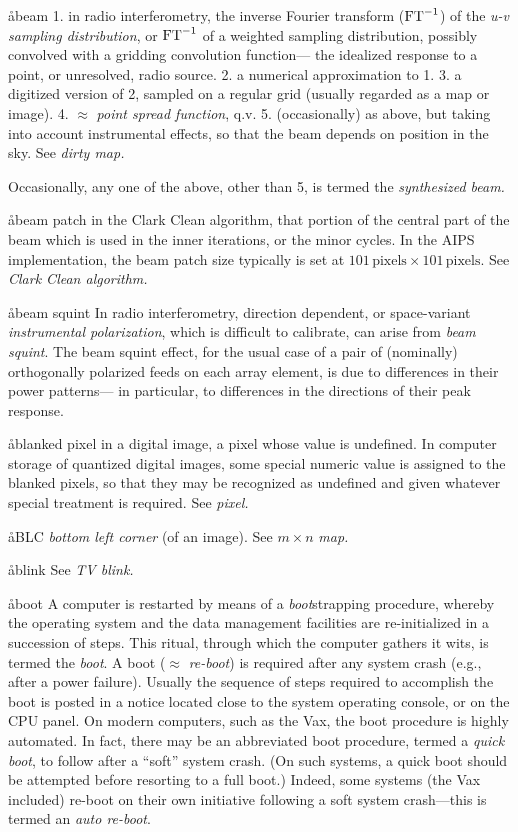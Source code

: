 \aa{beam}
1. in radio interferometry,
the inverse Fourier transform ($\hbox{\rm FT}^{-1}$) of the {\it u-v sampling distribution},
or $\hbox{\rm FT}^{-1}$ of a weighted \uv sampling distribution,
possibly convolved with a gridding convolution function---%
the idealized response to a point, or unresolved, radio
source.
\xspace2. a numerical approximation to 1.
\xspace3. a digitized version of 2, sampled on a
regular grid (usually regarded as a map or image).
\xspace 4. $\approx$  {\it point spread function}, q.v.
\xspace 5. (occasionally) as above, but taking into account
instrumental effects, so that the beam depends on position
in the sky.
See {\it dirty map.}
\par
Occasionally, any one of the above, other than 5, is termed the
{\it synthesized beam.}

\aa{beam patch}
in the Clark Clean algorithm, that portion of the central part
of the beam which is used in the inner iterations, or the minor cycles.
In the AIPS implementation, the beam patch size typically
is set at $101\,\text{pixels}\times101\,\text{pixels}$.
See {\it Clark Clean algorithm.}

\aa{beam squint}
In radio interferometry, direction dependent, or space-variant
{\it instrumental polarization}, which is difficult to calibrate,
can arise from {\it beam squint}.
The beam squint effect, for the usual case of a pair of (nominally)
orthogonally polarized feeds on each array element,
is due to differences in their power patterns---%
in particular, to differences in the directions of their peak response.

\aa{blanked pixel}
in a digital image, a pixel whose value is undefined.
In computer storage of quantized digital images, some
special numeric value is assigned to the blanked pixels,
so that they may be recognized as undefined and given whatever special
treatment is required.
See {\it pixel.}

\aa{BLC} {\it bottom left corner} (of an image).
See $m\times n$ {\it map.}

\aa{blink} See {\it TV blink.}

\aa{boot}
A computer is restarted by means of a
{\it boot}\/strapping procedure, whereby the operating system
and the data management facilities are re-initialized in a
succession of steps.
This ritual, through which the computer gathers it wits,
is termed the {\it boot}.
A boot ($\approx$ {\it re-boot}\/) is required after any
system crash (e.g., after a power failure).
Usually the sequence of steps required to accomplish the
boot is posted in a notice located close to the system operating
console, or on the CPU panel.
On modern computers, such as the Vax, the boot procedure is highly automated.
In fact, there may be an abbreviated boot procedure, termed
a {\it quick boot}, to follow after a ``soft'' system crash.
(On such systems, a quick boot should be attempted before
resorting to a full boot.)
Indeed, some systems (the Vax included) re-boot on their
own initiative following a soft system crash---this is
termed an {\it auto re-boot}.

